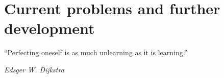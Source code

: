 \chapter{Current problems and further development}

\epigraph{``Perfecting oneself is as much unlearning as it is learning.''}{\textit{Edsger W. Dijkstra}}
